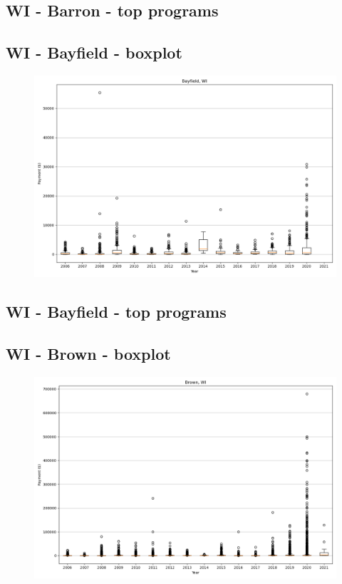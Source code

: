 \subsection*{WI - Barron - top programs}

\newpage
\subsection*{WI - Bayfield - boxplot}
\begin{figure}[h]
\centering
\includegraphics[width=7in]{../output/boxplots/counties/Bayfield-WI_boxplot.png}
\end{figure}


\subsection*{WI - Bayfield - top programs}

\newpage
\subsection*{WI - Brown - boxplot}
\begin{figure}[h]
\centering
\includegraphics[width=7in]{../output/boxplots/counties/Brown-WI_boxplot.png}
\end{figure}



